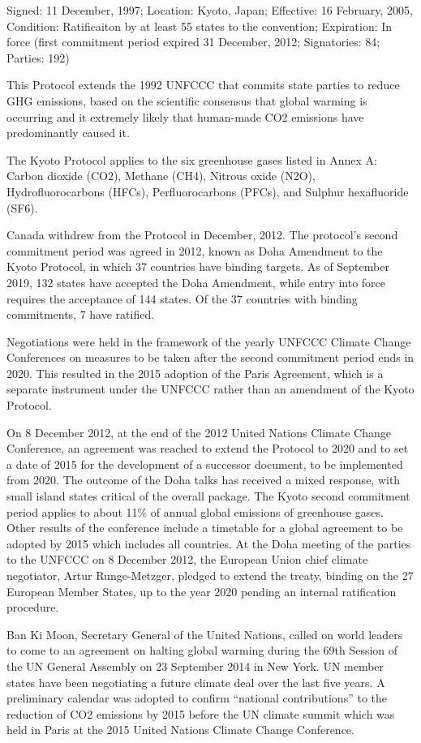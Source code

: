 \documentclass[
]{book}
\begin{document}
Signed: 11 December, 1997; Location: Kyoto, Japan; Effective: 16 February, 2005, Condition: Ratificaiton by at least 55 states to the convention; Expiration: In force (first commitment period expired 31 December, 2012; Signatories: 84; Parties: 192)

This Protocol extends the 1992 UNFCCC that commits state parties to reduce GHG emissions, based on the scientific consensus that global warming is occurring and it extremely likely that human-made CO2 emissions have predominantly caused it.

The Kyoto Protocol applies to the six greenhouse gases listed in Annex A: Carbon dioxide (CO2), Methane (CH4), Nitrous oxide (N2O), Hydrofluorocarbons (HFCs), Perfluorocarbons (PFCs), and Sulphur hexafluoride (SF6).

Canada withdrew from the Protocol in December, 2012. The protocol's second commitment period was agreed in 2012, known as Doha Amendment to the Kyoto Protocol, in which 37 countries have binding targets. As of September 2019, 132 states have accepted the Doha Amendment, while entry into force requires the acceptance of 144 states. Of the 37 countries with binding commitments, 7 have ratified.

Negotiations were held in the framework of the yearly UNFCCC Climate Change Conferences on measures to be taken after the second commitment period ends in 2020. This resulted in the 2015 adoption of the Paris Agreement, which is a separate instrument under the UNFCCC rather than an amendment of the Kyoto Protocol.

On 8 December 2012, at the end of the 2012 United Nations Climate Change Conference, an agreement was reached to extend the Protocol to 2020 and to set a date of 2015 for the development of a successor document, to be implemented from 2020. The outcome of the Doha talks has received a mixed response, with small island states critical of the overall package. The Kyoto second commitment period applies to about 11\% of annual global emissions of greenhouse gases. Other results of the conference include a timetable for a global agreement to be adopted by 2015 which includes all countries. At the Doha meeting of the parties to the UNFCCC on 8 December 2012, the European Union chief climate negotiator, Artur Runge-Metzger, pledged to extend the treaty, binding on the 27 European Member States, up to the year 2020 pending an internal ratification procedure.

Ban Ki Moon, Secretary General of the United Nations, called on world leaders to come to an agreement on halting global warming during the 69th Session of the UN General Assembly on 23 September 2014 in New York. UN member states have been negotiating a future climate deal over the last five years. A preliminary calendar was adopted to confirm ``national contributions'' to the reduction of CO2 emissions by 2015 before the UN climate summit which was held in Paris at the 2015 United Nations Climate Change Conference.
\end{document}
